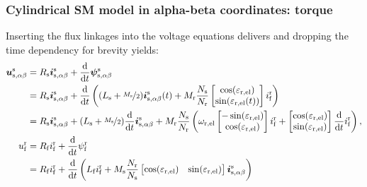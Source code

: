 \begin{frame}
	\frametitle{Cylindrical SM model in alpha-beta coordinates: torque}
	Inserting the flux linkages into the voltage equations delivers and dropping the time dependency for brevity yields:
	\begin{equation*}
		\begin{split}
			\bm{u}^\mathrm{s}_\mathrm{s,\alpha\beta} &= R_\mathrm{s} \bm{i}^\mathrm{s}_\mathrm{s,\alpha\beta}+ \frac{\mathrm{d}}{\mathrm{d}t}\bm{\psi}^\mathrm{s}_\mathrm{s,\alpha\beta}\\
			&= R_\mathrm{s} \bm{i}^\mathrm{s}_\mathrm{s,\alpha\beta}+ \frac{\mathrm{d}}{\mathrm{d}t}\left((L_\mathrm{s} +\nicefrac{M_\mathrm{s}}{2}) \bm{i}^\mathrm{s}_{\mathrm{s},\alpha\beta}(t) + M_\mathrm{r}\frac{N_\mathrm{s}}{N_\mathrm{r}} \begin{bmatrix}\cos(\varepsilon_\mathrm{r,el})\\ \sin(\varepsilon_\mathrm{r,el}(t))\end{bmatrix} i^\mathrm{r}_{\mathrm{f}}\right)\\
			&= R_\mathrm{s} \bm{i}^\mathrm{s}_\mathrm{s,\alpha\beta}+ (L_\mathrm{s} +\nicefrac{M_\mathrm{s}}{2}) \frac{\mathrm{d}}{\mathrm{d}t}\bm{i}^\mathrm{s}_{\mathrm{s},\alpha\beta} + M_\mathrm{r}\frac{N_\mathrm{s}}{N_\mathrm{r}} \left(\omega_\mathrm{r,el}\begin{bmatrix}-\sin(\varepsilon_\mathrm{r,el})\\ \cos(\varepsilon_\mathrm{r,el})\end{bmatrix}i^\mathrm{r}_{\mathrm{f}}  + \begin{bmatrix}\cos(\varepsilon_\mathrm{r,el})\\ \sin(\varepsilon_\mathrm{r,el})\end{bmatrix} \frac{\mathrm{d}}{\mathrm{d}t}i^\mathrm{r}_{\mathrm{f}}\right),\\
			u^\mathrm{r}_\mathrm{f} &= R_\mathrm{f} i^\mathrm{r}_\mathrm{f} + \frac{\mathrm{d}}{\mathrm{d}t}\psi^\mathrm{r}_\mathrm{f}\\
			&= R_\mathrm{f} i^\mathrm{r}_\mathrm{f} + \frac{\mathrm{d}}{\mathrm{d}t}\left(L_\mathrm{f} i^\mathrm{r}_\mathrm{f} + M_{\mathrm{s}}\frac{N_\mathrm{r}}{N_\mathrm{s}} \begin{bmatrix}\cos(\varepsilon_\mathrm{r,el})  & \sin(\varepsilon_\mathrm{r,el})\end{bmatrix}\bm{i}^\mathrm{s}_\mathrm{s,\alpha\beta}\right)\\

\end{split}
\end{equation*}
\end{frame}
